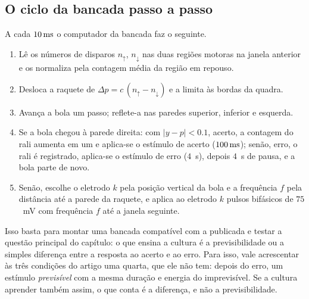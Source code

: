 \subsection*{O ciclo da bancada passo a passo}

A cada $10\,\text{ms}$ o computador da bancada faz o seguinte.
\begin{enumerate}
\item Lê os números de disparos $n_\uparrow$, $n_\downarrow$ nas duas regiões motoras na janela anterior e os normaliza pela contagem média da região em repouso.
\item Desloca a raquete de $\Delta p=c\,(n_\uparrow-n_\downarrow)$ e a limita às bordas da quadra.
\item Avança a bola um passo; reflete-a nas paredes superior, inferior e esquerda.
\item Se a bola chegou à parede direita: com $|y-p|<0.1$, acerto, a contagem do rali aumenta em um e aplica-se o estímulo de acerto ($100\,\text{ms}$); senão, erro, o rali é registrado, aplica-se o estímulo de erro ($4$~s), depois $4$~s de pausa, e a bola parte de novo.
\item Senão, escolhe o eletrodo $k$ pela posição vertical da bola e a frequência $f$ pela distância até a parede da raquete, e aplica ao eletrodo $k$ pulsos bifásicos de $75$~mV com frequência $f$ até a janela seguinte.
\end{enumerate}
Isso basta para montar uma bancada compatível com a publicada e testar a questão principal do capítulo: o que ensina a cultura é a previsibilidade ou a simples diferença entre a resposta ao acerto e ao erro. Para isso, vale acrescentar às três condições do artigo uma quarta, que ele não tem: depois do erro, um estímulo \emph{previsível} com a mesma duração e energia do imprevisível. Se a cultura aprender também assim, o que conta é a diferença, e não a previsibilidade.
